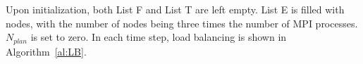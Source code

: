 
Upon initialization, both List F and List T are left empty. List E is filled with nodes, with the number of nodes being three times the number of MPI processes. $N_{plan}$ is set to zero. In each time step, load balancing is shown in Algorithm~\ref{al:LB}.%



